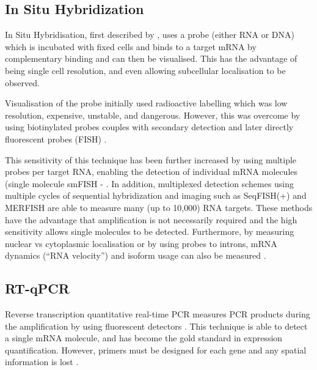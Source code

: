 \subsection{In Situ Hybridization}
In Situ Hybridisation, first described by \cite{Gall1969Formation}, uses a probe (either RNA or DNA) which is incubated with fixed cells and binds to a target mRNA by complementary binding and can then be visualised. This has the advantage of being single cell resolution, and even allowing subcellular localisation to be observed.

Visualisation of the probe initially used radioactive labelling which was low resolution, expensive, unstable, and dangerous. However, this was overcome by using biotinylated probes couples with secondary detection \parencite{Singer1982Actin} and later directly fluorescent probes (FISH) \parencite{Kislauskis1993Isoformspecific}.

This sensitivity of this technique has been further increased by using multiple probes per target RNA, enabling the detection of individual mRNA molecules (single molecule smFISH - \cite{Femino1998Visualization, Raj2008Imaging}. In addition, multiplexed detection schemes using multiple cycles of sequential hybridization and imaging such as SeqFISH(+) \parencite{Lubeck2014Singlecell,Eng2017Profiling,Eng2019Transcriptomescale} and MERFISH \parencite{Chen2015Spatially, Moffitt2016Highthroughput, Moffitt2016Highperformance, Xia2019Multiplexed} are able to measure many (up to 10,000) RNA targets. These methods have the advantage that amplification is not necessarily required and the high sensitivity allows single molecules to be detected. Furthermore, by measuring nuclear vs cytoplasmic localisation or by using probes to introns, mRNA dynamics (``RNA velocity'') and isoform usage can also be measured \parencite{Shah2018Dynamics, Xia2019Spatial}.


\subsection{RT-qPCR}
Reverse transcription quantitative real-time PCR measures PCR products during the amplification by using fluorescent detectors \parencite{Gibson1996novel, Heid1996Real, Chiang1996Use}. This technique is able to detect a single mRNA molecule, and has become the gold standard in expression quantification. However, primers must be designed for each gene and any spatial information is lost \parencite{Palmer2003New, Wong2005Realtime}.


